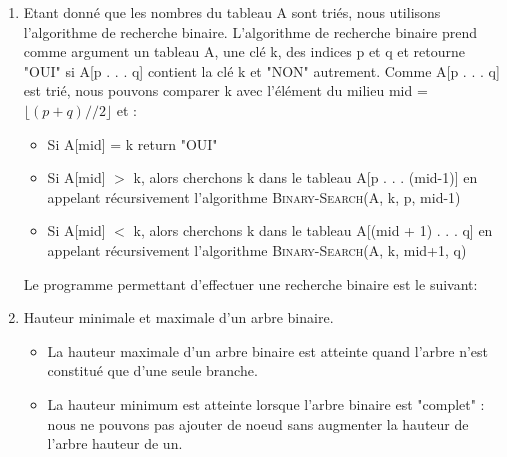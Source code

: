 \begin{Exercice}[20 minutes]
\begin{enumerate}
	\end{enumerate}
	\begin{solution}
		\begin{enumerate}
			\item Etant donné que les nombres du tableau A sont triés, nous utilisons l'algorithme de recherche binaire. L'algorithme de recherche binaire  prend comme argument un tableau A, une clé k, des indices p et q et retourne "OUI" si A[p . . . q]  contient la clé k et "NON" autrement. Comme A[p . . . q] est trié, nous pouvons comparer k avec l'élément du milieu mid = $\lfloor(p+q)//2\rfloor$  et : \\
				\begin{itemize}
					\item Si A[mid] = k return "OUI" \\
					\item Si A[mid] $>$ k, alors cherchons k dans le tableau A[p . . . (mid-1)] en appelant récursivement l'algorithme \textsc{Binary-Search}(A, k, p, mid-1) \\
					\item Si A[mid] $<$ k, alors cherchons k dans le tableau A[(mid + 1) . . . q] en appelant récursivement l'algorithme \textsc{Binary-Search}(A, k, mid+1, q)\\
				\end{itemize}
				Le programme permettant d'effectuer une recherche binaire est le suivant:
				
			\item Hauteur minimale et maximale d'un arbre binaire.
				\begin{itemize}
					\item La hauteur maximale d'un arbre binaire est atteinte quand l'arbre n'est constitué que d'une seule branche. \\
					
					\item La hauteur minimum est atteinte lorsque l'arbre binaire est "complet" : nous ne pouvons pas ajouter de noeud sans augmenter la hauteur de l'arbre hauteur de un. \\
					

\end{itemize}
\end{enumerate}
\end{solution}
\end{Exercice}
